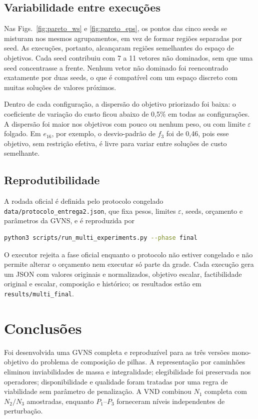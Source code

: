 \documentclass[10pt,twocolumn,a4paper]{article}
\begin{document}
\subsection{Variabilidade entre execuções}

Nas Figs.~\ref{fig:pareto_ws} e \ref{fig:pareto_eps}, os pontos das cinco seeds se misturam nos mesmos agrupamentos, em vez de formar regiões separadas por seed. As execuções, portanto, alcançaram regiões semelhantes do espaço de objetivos. Cada seed contribuiu com 7 a 11 vetores não dominados, sem que uma seed concentrasse a frente. Nenhum vetor não dominado foi reencontrado exatamente por duas seeds, o que é compatível com um espaço discreto com muitas soluções de valores próximos.

Dentro de cada configuração, a dispersão do objetivo priorizado foi baixa: o coeficiente de variação do custo ficou abaixo de 0,5\% em todas as configurações. A dispersão foi maior nos objetivos com pouco ou nenhum peso, ou com limite $\varepsilon$ folgado. Em $e_{16}$, por exemplo, o desvio-padrão de $f_3$ foi de 0,46, pois esse objetivo, sem restrição efetiva, é livre para variar entre soluções de custo semelhante.

\subsection{Reprodutibilidade}

A rodada oficial é definida pelo protocolo congelado \texttt{data/protocolo\_entrega2.json}, que fixa pesos, limites $\varepsilon$, seeds, orçamento e parâmetros da GVNS, e é reproduzida por
\begin{lstlisting}[language=bash]
python3 scripts/run_multi_experiments.py --phase final
\end{lstlisting}
O executor rejeita a fase oficial enquanto o protocolo não estiver congelado e não permite alterar o orçamento nem executar só parte da grade. Cada execução gera um JSON com valores originais e normalizados, objetivo escalar, factibilidade original e escalar, composição e histórico; os resultados estão em \texttt{results/multi\_final}.

\section{Conclusões}

Foi desenvolvida uma GVNS completa e reproduzível para as três versões mono-objetivo do problema de composição de pilhas. A representação por caminhões eliminou inviabilidades de massa e integralidade; elegibilidade foi preservada nos operadores; disponibilidade e qualidade foram tratadas por uma regra de viabilidade sem parâmetro de penalização. A VND combinou $N_1$ completa com $N_2/N_3$ amostradas, enquanto $P_1$--$P_3$ forneceram níveis independentes de perturbação.
\end{document}
